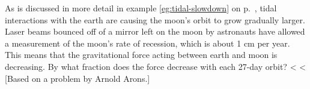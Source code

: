As is discussed in more detail in 
example \ref{eg:tidal-slowdown} on p.~\pageref{eg:tidal-slowdown},
tidal interactions with the earth are causing the
moon's orbit to grow gradually larger. Laser beams bounced
off of a mirror left on the moon by astronauts have allowed
a measurement of the moon's rate of recession, which is
about 1 cm per year. This means that the gravitational force
acting between earth and moon is decreasing. By what
fraction does the force decrease with each 27-day orbit?
<%
<%
[Based on a problem by Arnold Arons.]

